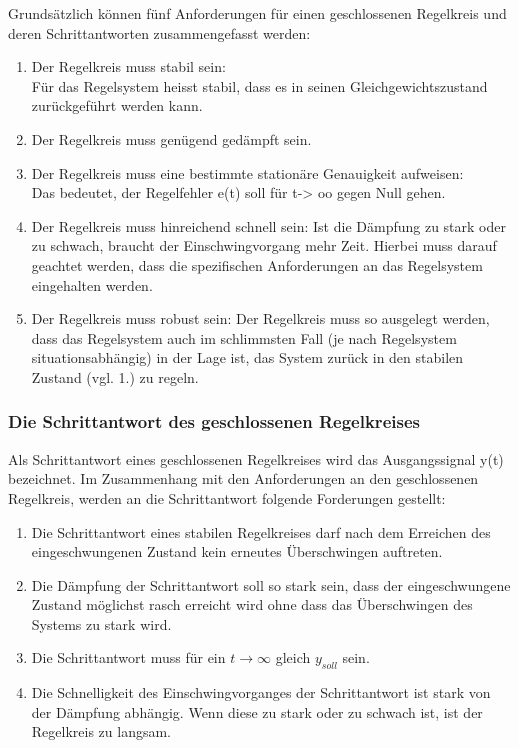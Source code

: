 Grunds\"atzlich k\"onnen f\"unf Anforderungen f\"ur einen geschlossenen
Regelkreis und deren Schrittantworten zusammengefasst werden:\\
\begin{enumerate}
\item Der Regelkreis muss stabil sein:\\
F\"ur das Regelsystem heisst stabil, dass es in seinen
Gleichgewichtszustand zur\"uckgef\"uhrt werden kann.
\item
Der Regelkreis muss gen\"ugend ged\"ampft sein.
\item
Der Regelkreis muss eine bestimmte station\"are Genauigkeit
aufweisen: \\Das bedeutet, der Regelfehler e(t) soll f\"ur t-> oo
gegen Null gehen. 
\item
Der Regelkreis muss hinreichend schnell sein: 
Ist die D\"ampfung zu stark oder zu schwach, braucht der
Einschwingvorgang mehr Zeit. Hierbei muss darauf geachtet werden, dass
die spezifischen Anforderungen an das Regelsystem eingehalten werden.
\item
Der Regelkreis muss robust sein: Der Regelkreis muss so ausgelegt
werden, dass das Regelsystem auch im schlimmsten Fall (je nach
Regelsystem situationsabh\"angig) in der Lage ist, das System zur\"uck
in den stabilen Zustand (vgl. 1.) zu regeln.
\end{enumerate}

\subsubsection{Die Schrittantwort des geschlossenen Regelkreises}

Als Schrittantwort eines geschlossenen Regelkreises wird das Ausgangssignal y(t) bezeichnet. Im Zusammenhang mit den Anforderungen an den geschlossenen Regelkreis, werden an die Schrittantwort folgende Forderungen gestellt:
\begin{enumerate}
\item
Die Schrittantwort eines stabilen Regelkreises darf nach dem Erreichen
des eingeschwungenen Zustand kein erneutes \"Uberschwingen auftreten.

\item
Die D\"ampfung der
Schrittantwort soll so stark sein, dass der eingeschwungene Zustand
m\"oglichst rasch erreicht wird ohne dass das \"Uberschwingen des
Systems zu stark wird.
\item Die Schrittantwort muss für ein $t\rightarrow\infty$ gleich $y_{soll}$ sein.
\item Die Schnelligkeit des
Einschwingvorganges der Schrittantwort ist stark von der D\"ampfung
abh\"angig. Wenn diese zu stark oder zu schwach ist, ist der Regelkreis zu langsam.
\end{enumerate}
